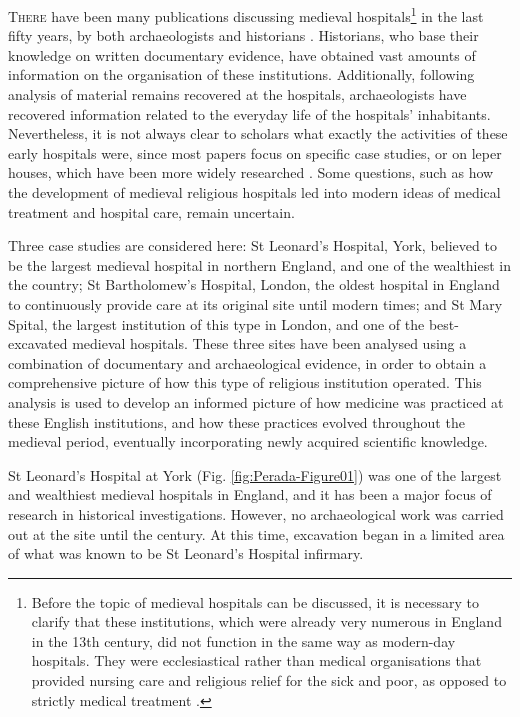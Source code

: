 \documentclass[%
	]{ijsra}
\begin{document}
\IJSRAopening%
\lettrine{T}{here} have been many publications discussing medieval hospitals\footnote{Before the topic of medieval hospitals can be discussed, it is necessary to clarify that these institutions, which were already very numerous in England in the 13th century, did not function in the same way as modern-day hospitals. They were ecclesiastical rather than medical organisations that provided nursing care and religious relief for the sick and poor, as opposed to strictly medical treatment \parencite{Clay_1966)}.} 
in the last fifty years, by both archaeologists and historians \parencites{Cullum_1991}{Phillpotts_1997}{Rawcliffe_1999}{White_2007}. 
Historians, who base their knowledge on written documentary evidence, have obtained vast amounts of information on the organisation of these institutions. Additionally, following analysis of material remains recovered at the hospitals, archaeologists have recovered information related to the everyday life of the hospitals’ inhabitants. Nevertheless, it is not always clear to scholars what exactly the activities of these early hospitals were, since most papers focus on specific case studies, or on leper houses, which have been more widely researched \parencite[76-78]{Watson_2006}. 
Some questions, such as how the development of medieval religious hospitals led into modern ideas of medical treatment and hospital care, remain uncertain.

Three case studies are considered here: St Leonard’s Hospital, York, believed to be the largest medieval hospital in northern England, and one of the wealthiest in the country; St Bartholomew’s Hospital, London, the oldest hospital in England to continuously provide care at its original site until modern times; and St Mary Spital, the largest institution of this type in London, and one of the best-excavated medieval hospitals. 
These three sites have been analysed using a combination of documentary and archaeological evidence, in order to obtain a comprehensive picture of how this type of religious institution operated. This analysis is used to develop an informed picture of how medicine was practiced at these English institutions, and how these practices evolved throughout the medieval period, eventually incorporating newly acquired scientific knowledge.


St Leonard’s Hospital at York (Fig. \ref{fig:Perada-Figure01}) %
 was one of the largest and wealthiest medieval hospitals in England, and it has been a major focus of research in historical investigations. However, no archaeological work was carried out at the site until the  century. 
 At this time, excavation began in a limited area of what was known to be St Leonard’s Hospital infirmary.
 
\end{document}
